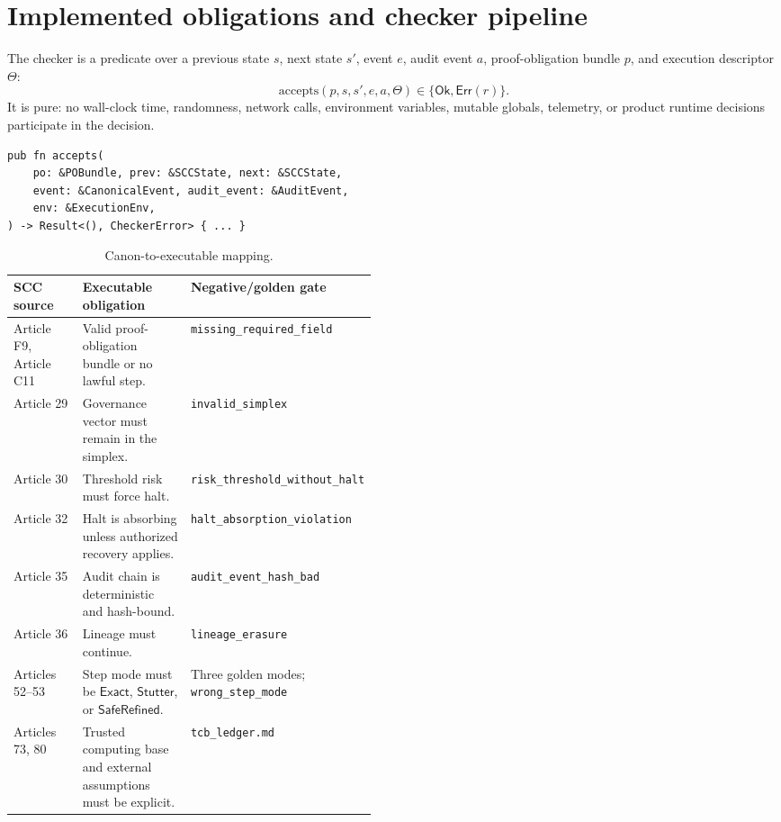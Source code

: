 \documentclass{article}
\newcommand{\Exact}{\ensuremath{\mathsf{Exact}}}
\newcommand{\Stutter}{\ensuremath{\mathsf{Stutter}}}
\newcommand{\SafeRefined}{\ensuremath{\mathsf{SafeRefined}}}
\newcommand{\Ok}{\ensuremath{\mathsf{Ok}}}
\newcommand{\Err}{\ensuremath{\mathsf{Err}}}
\newcommand{\gate}[1]{\texttt{\nolinkurl{#1}}}
\begin{document}
\section{Implemented obligations and checker pipeline}
The checker is a predicate over a previous state $s$, next state $s'$, event $e$, audit event $a$, proof-obligation bundle $p$, and execution descriptor $\Theta$:
\begin{equation}
\mathrm{accepts}(p,s,s',e,a,\Theta) \in \{\Ok,\Err(r)\}.
\end{equation}
It is pure: no wall-clock time, randomness, network calls, environment variables, mutable globals, telemetry, or product runtime decisions participate in the decision.
\begin{lstlisting}[caption={Rust source-of-truth checker public signature.}]
pub fn accepts(
    po: &POBundle, prev: &SCCState, next: &SCCState,
    event: &CanonicalEvent, audit_event: &AuditEvent,
    env: &ExecutionEnv,
) -> Result<(), CheckerError> { ... }
\end{lstlisting}

\begin{table}[t]
\caption{Canon-to-executable mapping.}
\label{tab:mapping}
\centering
\footnotesize
\begin{tabularx}{\linewidth}{p{0.19\linewidth}Yp{0.28\linewidth}}
\toprule
SCC source & Executable obligation & Negative/golden gate \\
\midrule
Article F9, Article C11 & Valid proof-obligation bundle or no lawful step. & \gate{missing_required_field} \\
Article 29 & Governance vector must remain in the simplex. & \gate{invalid_simplex} \\
Article 30 & Threshold risk must force halt. & \gate{risk_threshold_without_halt} \\
Article 32 & Halt is absorbing unless authorized recovery applies. & \gate{halt_absorption_violation} \\
Article 35 & Audit chain is deterministic and hash-bound. & \gate{audit_event_hash_bad} \\
Article 36 & Lineage must continue. & \gate{lineage_erasure} \\
Articles 52--53 & Step mode must be \Exact, \Stutter, or \SafeRefined. & Three golden modes; \gate{wrong_step_mode} \\
Articles 73, 80 & Trusted computing base and external assumptions must be explicit. & \gate{tcb_ledger.md} \\
\bottomrule
\end{tabularx}
\end{table}
\end{document}
